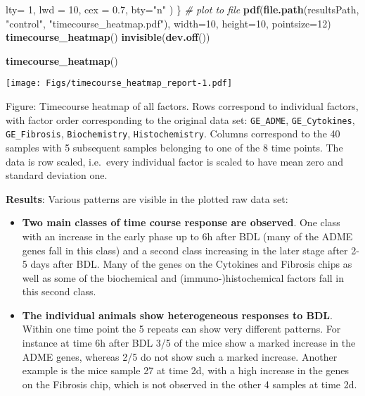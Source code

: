 \documentclass[]{article}
\newenvironment{Shaded}{\begin{snugshade}}{\end{snugshade}}
\newcommand{\KeywordTok}[1]{\textcolor[rgb]{0.13,0.29,0.53}{\textbf{{#1}}}}
\newcommand{\DataTypeTok}[1]{\textcolor[rgb]{0.13,0.29,0.53}{{#1}}}
\newcommand{\DecValTok}[1]{\textcolor[rgb]{0.00,0.00,0.81}{{#1}}}
\newcommand{\FloatTok}[1]{\textcolor[rgb]{0.00,0.00,0.81}{{#1}}}
\newcommand{\StringTok}[1]{\textcolor[rgb]{0.31,0.60,0.02}{{#1}}}
\newcommand{\CommentTok}[1]{\textcolor[rgb]{0.56,0.35,0.01}{\textit{{#1}}}}
\newcommand{\NormalTok}[1]{{#1}}
\begin{document}
\begin{Shaded}
\begin{Highlighting}[]
      \DataTypeTok{lty=} \DecValTok{1}\NormalTok{, }\DataTypeTok{lwd =} \DecValTok{10}\NormalTok{, }\DataTypeTok{cex =} \FloatTok{0.7}\NormalTok{, }\DataTypeTok{bty=}\StringTok{"n"}
  \NormalTok{)}
\NormalTok{\}}
\CommentTok{# plot to file}
\KeywordTok{pdf}\NormalTok{(}\KeywordTok{file.path}\NormalTok{(resultsPath, }\StringTok{"control"}\NormalTok{, }\StringTok{"timecourse_heatmap.pdf"}\NormalTok{), }
    \DataTypeTok{width=}\DecValTok{10}\NormalTok{, }\DataTypeTok{height=}\DecValTok{10}\NormalTok{, }\DataTypeTok{pointsize=}\DecValTok{12}\NormalTok{) }
\KeywordTok{timecourse_heatmap}\NormalTok{()}
\KeywordTok{invisible}\NormalTok{(}\KeywordTok{dev.off}\NormalTok{())}
\end{Highlighting}
\end{Shaded}

\begin{Shaded}
\begin{Highlighting}[]
\KeywordTok{timecourse_heatmap}\NormalTok{()}
\end{Highlighting}
\end{Shaded}

\texttt{[image: Figs/timecourse\_heatmap\_report-1.pdf]}

Figure: Timecourse heatmap of all factors. Rows correspond to individual
factors, with factor order corresponding to the original data set:
\texttt{GE\_ADME}, \texttt{GE\_Cytokines}, \texttt{GE\_Fibrosis},
\texttt{Biochemistry}, \texttt{Histochemistry}. Columns correspond to
the 40 samples with 5 subsequent samples belonging to one of the 8 time
points. The data is row scaled, i.e.~every individual factor is scaled
to have mean zero and standard deviation one.

\textbf{Results}: Various patterns are visible in the plotted raw data
set:

\begin{itemize}
\itemsep1pt\parskip0pt
\item
  \textbf{Two main classes of time course response are observed}. One
  class with an increase in the early phase up to 6h after BDL (many of
  the ADME genes fall in this class) and a second class increasing in
  the later stage after 2-5 days after BDL. Many of the genes on the
  Cytokines and Fibrosis chips as well as some of the biochemical and
  (immuno-)histochemical factors fall in this second class.
\item
  \textbf{The individual animals show heterogeneous responses to BDL}.
  Within one time point the 5 repeats can show very different patterns.
  For instance at time 6h after BDL 3/5 of the mice show a marked
  increase in the ADME genes, whereas 2/5 do not show such a marked
  increase. Another example is the mice sample 27 at time 2d, with a
  high increase in the genes on the Fibrosis chip, which is not observed
  in the other 4 samples at time 2d.
\end{itemize}
\end{document}

